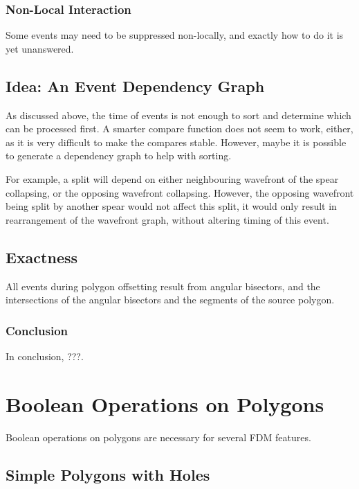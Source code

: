 \documentclass[12pt,a4paper,oneside,openany]{article}
\begin{document}
\subsubsection{Non-Local Interaction}

Some events may need to be suppressed non-locally, and exactly how to do it is yet unanswered.


\subsection{Idea: An Event Dependency Graph}

As discussed above, the time of events is not enough to sort and determine which can be processed first. A smarter compare function does not seem to work, either, as it is very difficult to make the compares stable. However, maybe it is possible to generate a dependency graph to help with sorting.

For example, a split will depend on either neighbouring wavefront of the spear collapsing, or the opposing wavefront collapsing. However, the opposing wavefront being split by another spear would not affect this split, it would only result in rearrangement of the wavefront graph, without altering timing of this event.



\subsection{Exactness}

All events during polygon offsetting result from angular bisectors, and the intersections of the angular bisectors and the segments of the source polygon.

\subsubsection{Conclusion}

In conclusion, ???.

\section{Boolean Operations on Polygons}

Boolean operations on polygons are necessary for several FDM features.

\subsection{Simple Polygons with Holes}
\end{document}
